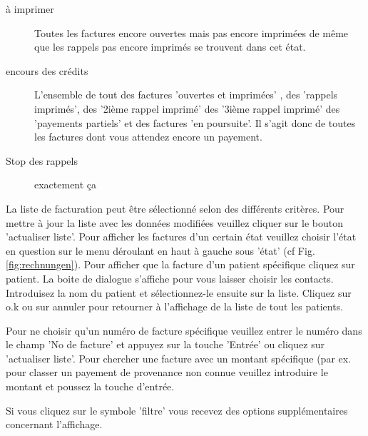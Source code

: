 \begin{description}
    \item [à imprimer] Toutes les factures encore ouvertes mais pas encore imprimées de même que les rappels pas encore imprimés se trouvent dans cet état.
    \item [encours des crédits ] L'ensemble de tout des factures 'ouvertes et imprimées' , des 'rappels imprimés', des '2ième rappel imprimé' des '3ième rappel imprimé' des 'payements partiels' et des factures 'en poursuite'. Il s'agit donc de toutes les factures dont vous attendez encore un payement.
    \item [Stop des rappels ] exactement ça
\end{description}

La liste de facturation peut être sélectionné selon des différents critères. Pour mettre à jour la liste avec les données modifiées veuillez cliquer sur le bouton 'actualiser liste'. Pour afficher les factures d'un certain état veuillez choisir l'état en question sur le menu déroulant en haut à gauche sous 'état' (cf Fig. \ref{fig:rechnungen}). Pour afficher que la facture d'un patient spécifique cliquez sur \glqq patient\grqq{}. La boite de dialogue s'affiche pour vous laisser choisir les contacts. Introduisez la nom du patient et sélectionnez-le ensuite sur la liste. Cliquez sur o.k ou sur annuler pour retourner à l'affichage de la liste de tout les patients.

Pour ne choisir qu'un numéro de facture spécifique veuillez entrer le numéro dans le champ 'No de facture' et appuyez sur la touche 'Entrée' ou cliquez sur 'actualiser liste'.  Pour chercher une facture avec un montant spécifique (par ex. pour classer un payement de provenance non connue veuillez introduire le montant et poussez la touche d'entrée.

\medskip
Si vous cliquez sur le symbole 'filtre' vous recevez des options supplémentaires concernant l'affichage. 

